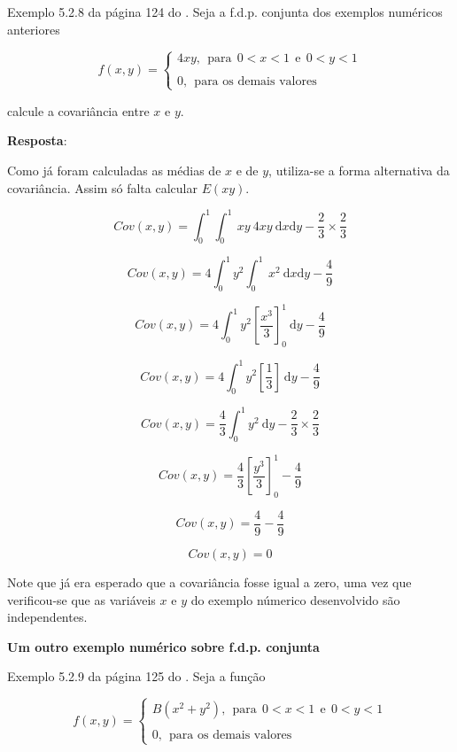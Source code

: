 \documentclass[
]{book}
\begin{document}
Exemplo 5.2.8 da página 124 do \citet{Sartoris2013}. Seja a f.d.p. conjunta dos exemplos numéricos anteriores

\begin{equation}
  f(x,y) = 
    \begin{cases}
      4xy,~~\text{para}~~0 < x < 1~~\text{e}~~0 < y < 1 \\
      \\
      0, ~~\text{para os demais valores}
    \end{cases}
\end{equation}

calcule a covariância entre \(x\) e \(y\).

\textbf{Resposta}:

Como já foram calculadas as médias de \(x\) e de \(y\), utiliza-se a forma alternativa da covariância. Assim só falta calcular \(E(xy)\).

\[
  Cov(x,y) = \int_{0}^{1}\int_{0}^{1}~xy~4xy~\text{d}x\text{d}y - \dfrac{2}{3}\times \dfrac{2}{3}
\]

\[
  Cov(x,y) = 4\int_{0}^{1}y^2\int_{0}^{1}~x^2~\text{d}x\text{d}y - \dfrac{4}{9}
\]

\[
  Cov(x,y) = 4\int_{0}^{1}y^2\left[ \dfrac{x^3}{3} \right]_{0}^{1}~\text{d}y - \dfrac{4}{9}
\]

\[
  Cov(x,y) = 4\int_{0}^{1}y^2\left[ \dfrac{1}{3} \right]~\text{d}y - \dfrac{4}{9}
\]

\[
  Cov(x,y) = \dfrac{4}{3}\int_{0}^{1}y^2~\text{d}y - \dfrac{2}{3}\times \dfrac{2}{3}
\]

\[
  Cov(x,y) = \dfrac{4}{3}\left[ \dfrac{y^3}{3} \right]_{0}^{1} - \dfrac{4}{9}
\]

\[
  Cov(x,y) = \dfrac{4}{9} - \dfrac{4}{9}
\]

\[
  Cov(x,y) = 0
\]

Note que já era esperado que a covariância fosse igual a zero, uma vez que verificou-se que as variáveis \(x\) e \(y\) do exemplo númerico desenvolvido são independentes.

\textbf{Um outro exemplo numérico sobre f.d.p. conjunta}

Exemplo 5.2.9 da página 125 do \citet{Sartoris2013}. Seja a função

\begin{equation}
  f(x,y) = 
    \begin{cases}
      B\left( x^2 + y^2 \right),~~\text{para}~~0 < x < 1~~\text{e}~~0 < y < 1 \\
      \\
      0, ~~\text{para os demais valores}
    \end{cases}
\end{equation}
\end{document}
